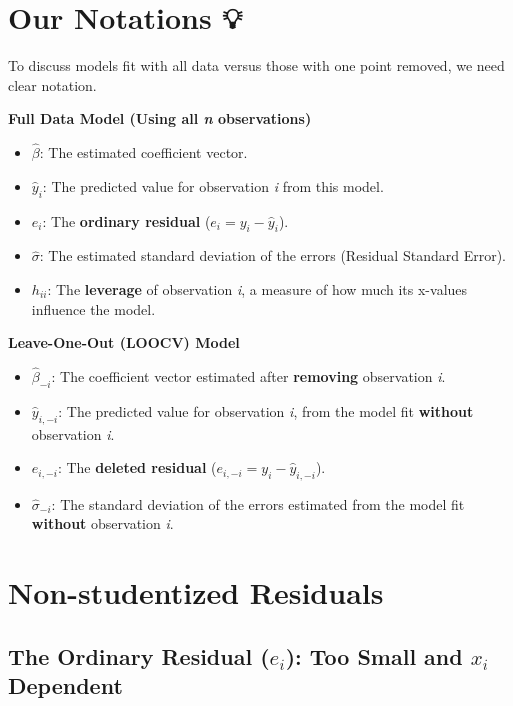 \documentclass[
]{article}
\providecommand{\tightlist}{%
  \setlength{\itemsep}{0pt}\setlength{\parskip}{0pt}}
\begin{document}
\section{Our Notations 💡}\label{our-notations}

To discuss models fit with all data versus those with one point removed,
we need clear notation.

\textbf{Full Data Model (Using all \emph{n} observations)}

\begin{itemize}
\tightlist
\item
  \(\hat{\beta}\): The estimated coefficient vector.
\item
  \(\hat{y}_i\): The predicted value for observation \emph{i} from this
  model.
\item
  \(e_i\): The \textbf{ordinary residual} (\(e_i = y_i - \hat{y}_i\)).
\item
  \(\hat{\sigma}\): The estimated standard deviation of the errors
  (Residual Standard Error).
\item
  \(h_{ii}\): The \textbf{leverage} of observation \emph{i}, a measure
  of how much its x-values influence the model.
\end{itemize}

\textbf{Leave-One-Out (LOOCV) Model}

\begin{itemize}
\tightlist
\item
  \(\hat{\beta}_{-i}\): The coefficient vector estimated after
  \textbf{removing} observation \emph{i}.
\item
  \(\hat{y}_{i,-i}\): The predicted value for observation \emph{i}, from
  the model fit \textbf{without} observation \emph{i}.
\item
  \(e_{i,-i}\): The \textbf{deleted residual}
  (\(e_{i,-i} = y_i - \hat{y}_{i,-i}\)).
\item
  \(\hat{\sigma}_{-i}\): The standard deviation of the errors estimated
  from the model fit \textbf{without} observation \emph{i}.
\end{itemize}

\section{Non-studentized Residuals}\label{non-studentized-residuals}

\subsection{\texorpdfstring{\textbf{The Ordinary Residual (}\(e_i\)):
Too Small and \(x_i\)
Dependent}{The Ordinary Residual (e\_i): Too Small and x\_i Dependent}}\label{the-ordinary-residual-e_i-too-small-and-x_i-dependent}
\end{document}
